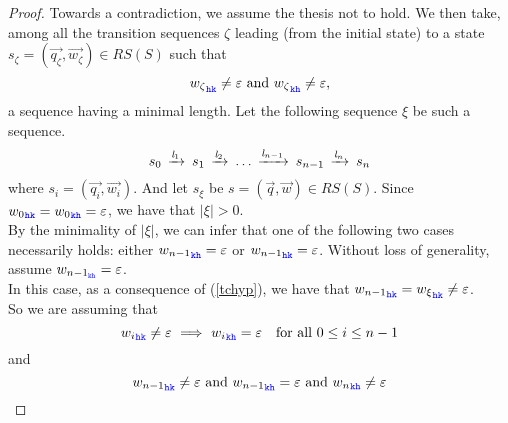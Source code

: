 \begin{proof}
Towards a contradiction, we assume the thesis not to hold.
We then take, among all the transition sequences $\zeta$ leading (from the initial state) to a state $s_{\zeta}= (\vec{q_\zeta},\vec{w_\zeta}) \in RS(S)$
such that 
\begin{equation}
\label{tchyp}
{w_\zeta}_{\HH\KK}\neq \varepsilon  \text{ and } {w_\zeta}_{\KK\HH} \neq \varepsilon,
\end{equation}
a sequence having a minimal length.
 Let the following sequence $\xi$ be such a sequence.
$$s_0\,\xrightarrow{\mathit{l}_1}_{{}}\,s_1\,\xrightarrow{\mathit{l}_2}_{{}}\, \ldots \,\xrightarrow{\mathit{l}_{n-1}}_{{}}\,s_{n-1}\,\xrightarrow{\mathit{l}_n}_{{}}\,s_n$$
where $s_i=({\vec{q_i}},{\vec{w_i}})$. And let $s_{\xi}$ be $s=(\vec{q},\vec{w}) \in RS(S)$.
Since ${w_0}_{{\mathtt{\color{blue}{ {h}}}}{\mathtt{\color{blue}{ {k}}}}} = {w_0}_{{\mathtt{\color{blue}{ {k}}}}{\mathtt{\color{blue}{ {h}}}}} = \varepsilon$, we have that  $|\xi| > 0$.
\\
By the minimality of $|\xi |$, we can infer that one of the following two cases necessarily holds:
either    ${w_{n-1}}_{{\mathtt{\color{blue}{ {k}}}}{\mathtt{\color{blue}{ {h}}}}} = \varepsilon$ or ${w_{n-1}}_{{\mathtt{\color{blue}{ {h}}}}{\mathtt{\color{blue}{ {k}}}}} = \varepsilon$.
Without loss of generality, assume
  $w_{{n-1}_{{\mathtt{\color{blue}{ {k}}}}{\mathtt{\color{blue}{ {h}}}}}} = \varepsilon$.\\
In this case, as a consequence of (\ref{tchyp}), we have that ${w_{n-1}}_{{\mathtt{\color{blue}{ {h}}}}{\mathtt{\color{blue}{ {k}}}}}= {w_\xi}_{{\mathtt{\color{blue}{ {h}}}}{\mathtt{\color{blue}{ {k}}}}} \neq \varepsilon$.\\
So we are assuming that 
\begin{equation}
\label{allnonbothnonempty}
{w_i}_{\HH\KK}\neq \varepsilon \implies {w_i}_{\KK\HH}= \varepsilon \text{~~ for all } 0\leq i \leq n-1
\end{equation}
and
\begin{equation}
\label{ngetsnonempty}
{{w_{n-1}}}_{\HH\KK} \neq\varepsilon  \text{ and } {{w_{n-1}}}_{\KK\HH} = \varepsilon \text{ and } {w_{n}}_{\KK\HH}\neq \varepsilon
\end{equation}



\end{proof}

